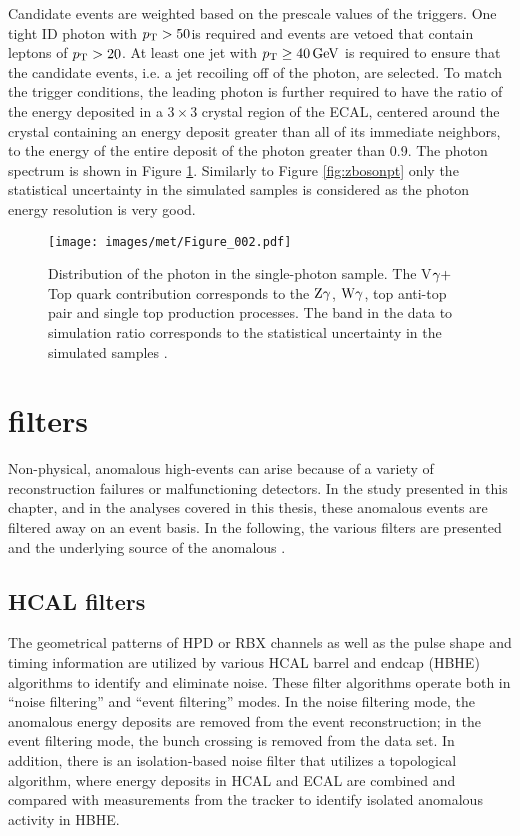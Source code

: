 Candidate events are weighted based on the prescale values of the triggers.
One tight ID photon with $p_{\mathrm{T}} > 50$\GeV is required and events are vetoed that contain leptons of $p_{\mathrm{T}} > 20$\GeV. 
At least one jet with $p_{\mathrm{T}}\geq40\,\text{Ge\hspace{-.08em}V}$ is required to ensure that the candidate events, i.e. a jet recoiling off of the photon, are selected.   
To match the trigger conditions, the leading photon is further required to have the ratio of the energy deposited in a $3\times3$ crystal region of the ECAL, centered around the crystal containing an energy deposit greater than all of its immediate neighbors, to the energy of the entire deposit of the photon greater than 0.9.
The photon \qt spectrum is shown in Figure \ref{fig:gbosonpt}. 
Similarly to Figure \ref{fig:zbosonpt} only the statistical uncertainty in the simulated samples is considered as the photon energy resolution is very good.
\begin{figure}[!htb]
  \centering
  \texttt{[image: images/met/Figure\_002.pdf]}
  \caption{Distribution of the photon \qt in the single-photon sample. The V$\gamma+$Top quark contribution corresponds to the $\mathrm{Z}\gamma$, $\mathrm{W}\gamma$, top anti-top pair and single top production processes. The band in the data to simulation ratio corresponds to the statistical uncertainty in the simulated samples \cite{Sirunyan:2019kia}.  }
  \label{fig:gbosonpt}
\end{figure}                                                                                                                                                                 
\section{\ptmiss filters}                                                                                                                                     
\noindent
\justify
\label{sec:filters}
Non-physical, anomalous high-\ptmiss events can arise because of a variety of reconstruction failures or malfunctioning detectors.  
In the \ptmiss study presented in this chapter, and in the analyses covered in this thesis, these anomalous \ptmiss events are filtered away on an event basis. 
In the following, the various filters are presented and the underlying source of the anomalous \ptmiss. 
\subsection*{HCAL filters}
\noindent
\justify
The geometrical patterns of HPD or RBX channels as well as the pulse shape and timing information are utilized by various HCAL barrel and endcap (HBHE) algorithms to identify and eliminate noise. 
These filter algorithms operate both in ``noise filtering'' and ``event filtering'' modes.
In the noise filtering mode, the anomalous energy deposits are removed from the event reconstruction; in the event filtering mode, the bunch crossing is removed from the data set. 
In addition, there is an isolation-based noise filter that utilizes a topological algorithm, where energy deposits in HCAL and ECAL are combined
and compared with measurements from the tracker to identify isolated anomalous activity in HBHE. 
